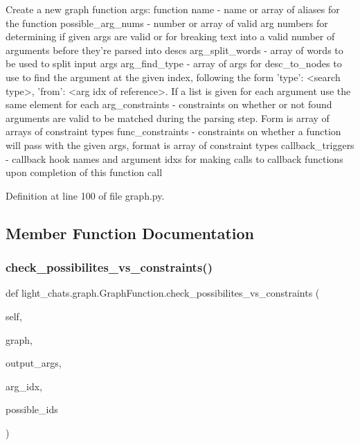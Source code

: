 \begin{DoxyVerb}Create a new graph function
args:
function name - name or array of aliases for the function
possible_arg_nums - number or array of valid arg numbers for
    determining if given args are valid or for breaking text into
    a valid number of arguments before they're parsed into descs
arg_split_words - array of words to be used to split input args
arg_find_type - array of args for desc_to_nodes to use to find the
    argument at the given index, following the form
    {'type': <search type>, 'from': <arg idx of reference>}. If a
    list is given for each argument use the same element for each
arg_constraints - constraints on whether or not found arguments are
    valid to be matched during the parsing step. Form is array of
    arrays of constraint types
func_constraints - constraints on whether a function will pass with
    the given args, format is array of constraint types
callback_triggers - callback hook names and argument idxs for making
    calls to callback functions upon completion of this function call
\end{DoxyVerb}
 

Definition at line 100 of file graph.\+py.



\subsection{Member Function Documentation}
\mbox{\label{classlight__chats_1_1graph_1_1GraphFunction_af627ff84086a094b84da04e30a97779e}} 
\subsubsection{\texorpdfstring{check\+\_\+possibilites\+\_\+vs\+\_\+constraints()}{check\_possibilites\_vs\_constraints()}}
{\footnotesize\ttfamily def light\+\_\+chats.\+graph.\+Graph\+Function.\+check\+\_\+possibilites\+\_\+vs\+\_\+constraints (\begin{DoxyParamCaption}\item[{}]{self,  }\item[{}]{graph,  }\item[{}]{output\+\_\+args,  }\item[{}]{arg\+\_\+idx,  }\item[{}]{possible\+\_\+ids }\end{DoxyParamCaption})}

